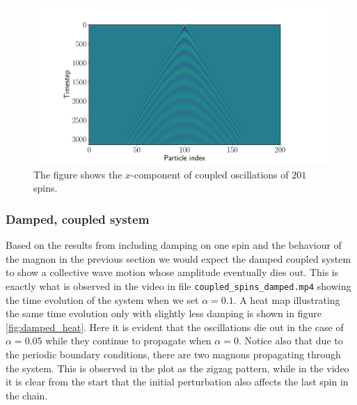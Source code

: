 \begin{remark}
\begin{figure}[htb]
	\centering
	\includegraphics[width=\columnwidth]{../fig/wave_200.pdf}
	\caption{The figure shows the $x$-component of coupled oscillations of $201$ spins.}
	\label{fig:200_heat}
\end{figure}

\end{remark}

\subsubsection{Damped, coupled system}

Based on the results from including damping on one spin and the behaviour of the magnon in the previous section we would expect the damped coupled system to show a collective wave motion whose amplitude eventually dies out. This is exactly what is observed in the video in file \lstinline|coupled_spins_damped.mp4| showing the time evolution of the system when we set $\alpha = 0.1$. A heat map illustrating the same time evolution only with slightly less damping is shown in figure \ref{fig:damped_heat}. Here it is evident that the oscillations die out in the case of $\alpha = 0.05$ while they continue to propagate when $\alpha = 0$. Notice also that due to the periodic boundary conditions, there are two magnons propagating through the system. This is observed in the plot as the zigzag pattern, while in the video it is clear from the start that the initial perturbation also affects the last spin in the chain.

